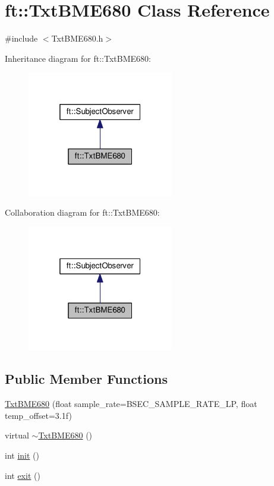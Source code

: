 \hypertarget{classft_1_1_txt_b_m_e680}{}\section{ft\+:\+:Txt\+B\+M\+E680 Class Reference}
\label{classft_1_1_txt_b_m_e680}


{\ttfamily \#include $<$Txt\+B\+M\+E680.\+h$>$}



Inheritance diagram for ft\+:\+:Txt\+B\+M\+E680\+:
\nopagebreak
\begin{figure}[H]
\begin{center}
\leavevmode
\includegraphics[width=181pt]{classft_1_1_txt_b_m_e680__inherit__graph}
\end{center}
\end{figure}


Collaboration diagram for ft\+:\+:Txt\+B\+M\+E680\+:
\nopagebreak
\begin{figure}[H]
\begin{center}
\leavevmode
\includegraphics[width=181pt]{classft_1_1_txt_b_m_e680__coll__graph}
\end{center}
\end{figure}
\subsection*{Public Member Functions}
\begin{DoxyCompactItemize}
\item 
\hyperlink{classft_1_1_txt_b_m_e680_a51424e30b01f39e9e89799939782b7d3}{Txt\+B\+M\+E680} (float sample\+\_\+rate=B\+S\+E\+C\+\_\+\+S\+A\+M\+P\+L\+E\+\_\+\+R\+A\+T\+E\+\_\+\+LP, float temp\+\_\+offset=3.\+1f)
\item 
virtual \hyperlink{classft_1_1_txt_b_m_e680_a0b19a4ae70789f2c438b79e1a66b7663}{$\sim$\+Txt\+B\+M\+E680} ()
\item 
int \hyperlink{classft_1_1_txt_b_m_e680_ae06fb1fcb0180fb433fe7e79a6bf75b9}{init} ()
\item 
int \hyperlink{classft_1_1_txt_b_m_e680_a539a21a9fb7aac1ed5b2f36df542b5a3}{exit} ()
\end{DoxyCompactItemize}
